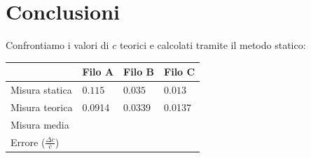 \section{Conclusioni}
Confrontiamo i valori di $c$ teorici e calcolati tramite il metodo statico:
\begin{center}
\begin{tabular}{l|lll}
& Filo A & Filo B & Filo C \\
\midrule
Misura statica & $0.115$ & $0.035$& $0.013$ \\
Misura teorica & 0.0914 & 0.0339 & 0.0137 \\
\midrule
Misura media & \\
Errore ($\frac{\Delta c}{\bar{c}}$) & \\
\end{tabular}
\end{center}

